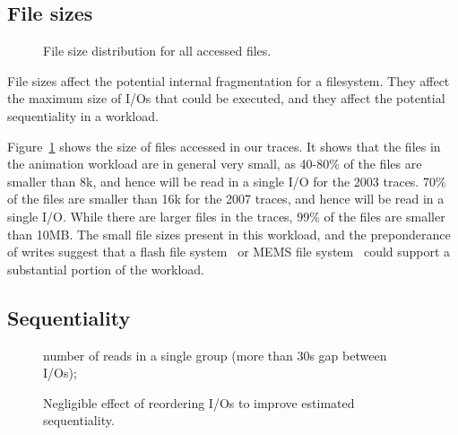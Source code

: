 \subsection{File sizes}

\begin{figure}
\caption{File size distribution for all accessed files.}
\label{fig:file-size}
\end{figure}

File sizes affect the potential internal fragmentation for a
filesystem.  They affect the maximum size of I/Os that could be
executed, and they affect the potential sequentiality in a workload.

Figure~\ref{fig:file-size} shows the size of files accessed in our
traces.  It shows that the files in the animation workload are in
general very small, as 40-80\% of the files are smaller than 8k, and
hence will be read in a single I/O for the 2003 traces.  70\% of the
files are smaller than 16k for the 2007 traces, and hence will be read
in a single I/O.  While there are larger files in the traces, 99\% of
the files are smaller than 10MB.  The small file sizes present in this
workload, and the preponderance of writes suggest that a flash file
system~\cite{Kawaguchi95aflash-memory} or MEMS file
system~\cite{SchlosserFast04} could support a substantial portion of
the workload.

\subsection{Sequentiality}

\begin{figure*}
\caption{number of reads in a single group (more than 30s gap between I/Os); }
\label{fig:seq-analysis}
\end{figure*}

\begin{figure}
\caption{Negligible effect of reordering I/Os to improve estimated sequentiality.}
\label{fig:seq-bytes-compare}
\end{figure}

